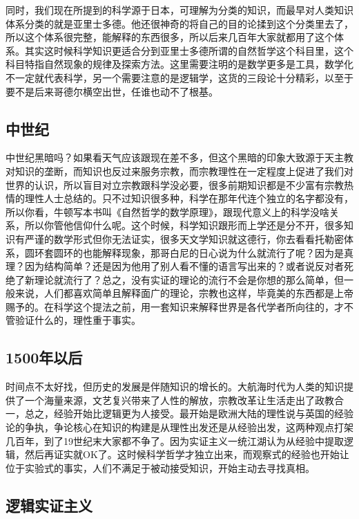 \documentclass[]{tufte-book}
\begin{document}
同时，我们现在所提到的科学源于日本，可理解为分类的知识，而最早对人类知识体系分类的就是亚里士多德。他还很神奇的将自己的目的论揉到这个分类里去了，所以这个体系很完整，能解释的东西很多，所以后来几百年大家就都用了这个体系。其实这时候科学知识更适合分到亚里士多德所谓的自然哲学这个科目里，这个科目特指自然现象的规律及探索方法。这里需要注明的是数学更多是工具，数学化不一定就代表科学，另一个需要注意的是逻辑学，这货的三段论十分精彩，以至于要不是后来哥德尔横空出世，任谁也动不了根基。

\hypertarget{ux4e2dux4e16ux7eaa}{%
\subsection{中世纪}\label{ux4e2dux4e16ux7eaa}}

中世纪黑暗吗？如果看天气应该跟现在差不多，但这个黑暗的印象大致源于天主教对知识的垄断，而知识也反过来服务宗教，而宗教理性在一定程度上促进了我们对世界的认识，所以盲目对立宗教跟科学没必要，很多前期知识都是不少富有宗教热情的理性人士总结的。只不过知识很多种，科学在那年代连个独立的名字都没有，所以你看，牛顿写本书叫《自然哲学的数学原理》，跟现代意义上的科学没啥关系，所以你管他信仰什么呢。这个时候，科学知识跟形而上学还是分不开，很多知识有严谨的数学形式但你无法证实，很多天文学知识就这德行，你去看看托勒密体系，圆环套圆环的也能解释现象，那哥白尼的日心说为什么就流行了呢？因为是真理？因为结构简单？还是因为他用了别人看不懂的语言写出来的？或者说反对者死绝了新理论就流行了？总之，没有实证的理论的流行不会是你想的那么简单，但一般来说，人们都喜欢简单且解释面广的理论，宗教也这样，毕竟美的东西都是上帝赐予的。在科学这个提法之前，用一套知识来解释世界是各代学者所向往的，才不管验证什么的，理性重于事实。

\hypertarget{ux5e74ux4ee5ux540e}{%
\subsection{1500年以后}\label{ux5e74ux4ee5ux540e}}

时间点不太好找，但历史的发展是伴随知识的增长的。大航海时代为人类的知识提供了一个海量来源，文艺复兴带来了人性的解放，宗教改革让生活走出了政教合一，总之，经验开始比逻辑更为人接受。最开始是欧洲大陆的理性说与英国的经验论的争执，争论核心在知识的构建是从理性出发还是从经验出发，这两种观点打架几百年，到了19世纪末大家都不争了。因为实证主义一统江湖认为从经验中提取逻辑，然后再证实就OK了。这时候科学哲学才独立出来，而观察式的经验也开始让位于实验式的事实，人们不满足于被动接受知识，开始主动去寻找真相。

\hypertarget{ux903bux8f91ux5b9eux8bc1ux4e3bux4e49}{%
\subsection{逻辑实证主义}\label{ux903bux8f91ux5b9eux8bc1ux4e3bux4e49}}
\end{document}
